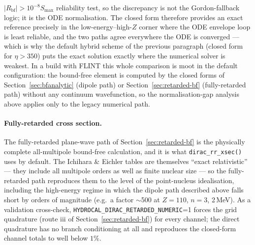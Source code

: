 \documentclass[11pt,a4paper]{article}
\begin{document}
$|R_{\mathrm{bf}}|>10^{-8}S_{\max}$ reliability test, so the discrepancy is
not the Gordon-fallback logic; it is the ODE normalisation.  The closed
form therefore provides an exact reference precisely in the
low-energy--high-$Z$ corner where the ODE envelope loop is least reliable,
and the two paths agree everywhere the ODE is converged --- which is why
the default hybrid scheme of the previous paragraph (closed form for
$\eta>350$) puts the exact solution exactly where the numerical solver is
weakest.  In a build with FLINT this whole comparison is moot in the
default configuration: the bound-free element is computed by the closed
forms of Section~\ref{sec:bfanalytic} (dipole path) or
Section~\ref{sec:retarded-bf} (fully-retarded path) without any
continuum wavefunction, so the normalisation-gap analysis above applies
only to the legacy numerical path.

\paragraph{Fully-retarded cross section.}
The fully-retarded plane-wave path of Section~\ref{sec:retarded-bf} is
the physically complete all-multipole bound-free calculation, and it is
what {\tt dirac\_rr\_xsec()} uses by default.  The Ichihara \& Eichler
tables \cite{Ichihara2000} are themselves ``exact relativistic'' ---
they include all multipole orders as well as finite nuclear size --- so
the fully-retarded path reproduces them to the level of the point-nucleus
idealisation, including the high-energy regime in which the dipole path
described above falls short by orders of magnitude (e.g.\ a factor
$\sim$500 at $Z=110$, $n=3$, 2\,MeV).  As a validation cross-check,
{\tt HYDROCAL\_DIRAC\_RETARDED\_NUMERIC}=1 forces the grid quadrature
(route iii of Section~\ref{sec:retarded-bf}) for every channel; the
direct quadrature has no branch conditioning at all and reproduces the
closed-form channel totals to well below $1\%$.
\end{document}
